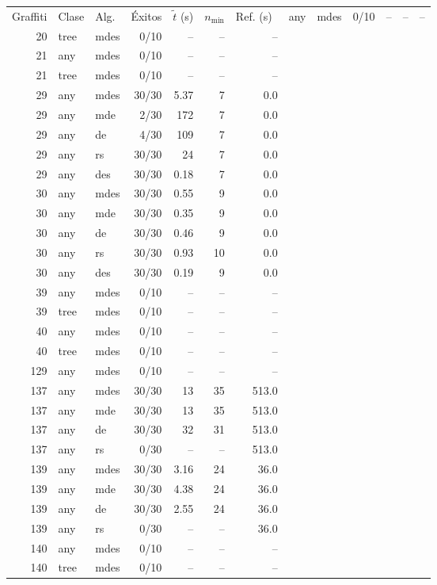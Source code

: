 \begin{tabular}{rl l rrr r}
\hline
Graffiti & Clase & Alg. & Éxitos & $\tilde t$ (s) & $n_{\min}$ & Ref. (s)\
 & any & mdes & 0/10 & -- & -- & --\\
20 & tree & mdes & 0/10 & -- & -- & --\\
21 & any & mdes & 0/10 & -- & -- & --\\
21 & tree & mdes & 0/10 & -- & -- & --\\
29 & any & mdes & 30/30 & 5.37 & 7 & 0.0\\
29 & any & mde & 2/30 & 172 & 7 & 0.0\\
29 & any & de & 4/30 & 109 & 7 & 0.0\\
29 & any & rs & 30/30 & 24 & 7 & 0.0\\
29 & any & des & 30/30 & 0.18 & 7 & 0.0\\
30 & any & mdes & 30/30 & 0.55 & 9 & 0.0\\
30 & any & mde & 30/30 & 0.35 & 9 & 0.0\\
30 & any & de & 30/30 & 0.46 & 9 & 0.0\\
30 & any & rs & 30/30 & 0.93 & 10 & 0.0\\
30 & any & des & 30/30 & 0.19 & 9 & 0.0\\
39 & any & mdes & 0/10 & -- & -- & --\\
39 & tree & mdes & 0/10 & -- & -- & --\\
40 & any & mdes & 0/10 & -- & -- & --\\
40 & tree & mdes & 0/10 & -- & -- & --\\
129 & any & mdes & 0/10 & -- & -- & --\\
137 & any & mdes & 30/30 & 13 & 35 & 513.0\\
137 & any & mde & 30/30 & 13 & 35 & 513.0\\
137 & any & de & 30/30 & 32 & 31 & 513.0\\
137 & any & rs & 0/30 & -- & -- & 513.0\\
139 & any & mdes & 30/30 & 3.16 & 24 & 36.0\\
139 & any & mde & 30/30 & 4.38 & 24 & 36.0\\
139 & any & de & 30/30 & 2.55 & 24 & 36.0\\
139 & any & rs & 0/30 & -- & -- & 36.0\\
140 & any & mdes & 0/10 & -- & -- & --\\
140 & tree & mdes & 0/10 & -- & -- & --\\

\end{tabular}
